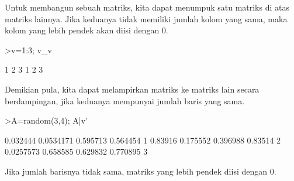 \begin{eulernotebook}
\begin{eulercomment}
\begin{eulercomment}
\begin{eulercomment}
Untuk membangun sebuah matriks, kita dapat menumpuk satu matriks di
atas matriks lainnya. Jika keduanya tidak memiliki jumlah kolom yang
sama, maka kolom yang lebih pendek akan diisi dengan 0.
\end{eulercomment}
\begin{eulerprompt}
>v=1:3; v_v
\end{eulerprompt}
\begin{euleroutput}
              1             2             3 
              1             2             3 
\end{euleroutput}
\begin{eulercomment}
Demikian pula, kita dapat melampirkan matriks ke matriks lain secara
berdampingan, jika keduanya mempunyai jumlah baris yang sama.
\end{eulercomment}
\begin{eulerprompt}
>A=random(3,4); A|v'
\end{eulerprompt}
\begin{euleroutput}
       0.032444     0.0534171      0.595713      0.564454             1 
        0.83916      0.175552      0.396988       0.83514             2 
      0.0257573      0.658585      0.629832      0.770895             3 
\end{euleroutput}
\begin{eulercomment}
Jika jumlah barisnya tidak sama, matriks yang lebih pendek diisi
dengan 0.


\end{eulercomment}
\end{eulercomment}
\end{eulercomment}
\end{eulernotebook}
